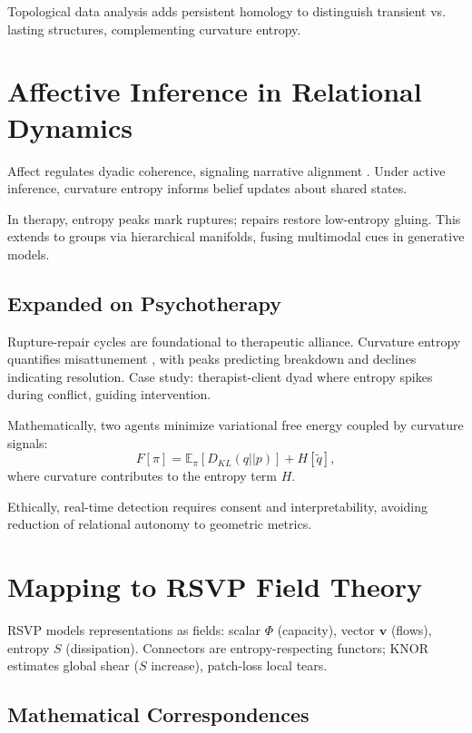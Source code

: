 \documentclass{article}
\theoremstyle{definition}
\begin{document}
Topological data analysis adds persistent homology to distinguish transient vs. lasting structures, complementing curvature entropy.

\section{Affective Inference in Relational Dynamics}

Affect regulates dyadic coherence, signaling narrative alignment \cite{hinrichs2025hyperscanning}. Under active inference, curvature entropy informs belief updates about shared states.

In therapy, entropy peaks mark ruptures; repairs restore low-entropy gluing. This extends to groups via hierarchical manifolds, fusing multimodal cues in generative models.

\subsection{Expanded on Psychotherapy}

Rupture-repair cycles are foundational to therapeutic alliance. Curvature entropy quantifies misattunement \cite{bolis2017dialectical}, with peaks predicting breakdown and declines indicating resolution. Case study: therapist-client dyad where entropy spikes during conflict, guiding intervention.

Mathematically, two agents minimize variational free energy coupled by curvature signals:
\[
F[\pi] = \mathbb{E}_\pi [D_{KL}(q||p)] + H[\tilde{q}],
\]
where curvature contributes to the entropy term $H$.

Ethically, real-time detection requires consent and interpretability, avoiding reduction of relational autonomy to geometric metrics.

\section{Mapping to RSVP Field Theory}

RSVP models representations as fields: scalar $\Phi$ (capacity), vector $\mathbf{v}$ (flows), entropy $S$ (dissipation). Connectors are entropy-respecting functors; KNOR estimates global shear ($S$ increase), patch-loss local tears.

\subsection{Mathematical Correspondences}
\end{document}
